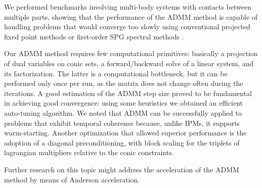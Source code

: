\documentclass[final,3p]{elsarticle}
\begin{document}
We performed benchmarks involving multi-body systems with contacts between multiple parts, showing that the performance of the ADMM method is capable of handling problems that would converge too slowly using conventional projected fixed point methods or first-order SPG spectral methods \cite{heynIJNME2013}.

Our ADMM method requires few computational primitives: basically a projection of dual variables on conic sets, a forward/backward solve of a linear system, and its factorization. The latter is a computational bottleneck, but it can be performed only once per run, as the matrix does not change often during the iterations. 
A good estimation of the ADMM step size proved to be fundamental in achieving good convergence: using some heuristics we obtained an efficient auto-tuning algorithm. 
We noted that ADMM can be successfully applied to problems that exhibit temporal coherence because, unlike IPMs, it supports warm-starting. 
Another optimization that allowed superior performance is the adoption of a diagonal preconditioning, with block scaling for the triplets of lagrangian multipliers relative to the conic constraints.

Further research on this topic might address the acceleration of the ADMM method by means of Anderson acceleration.




\end{document}
